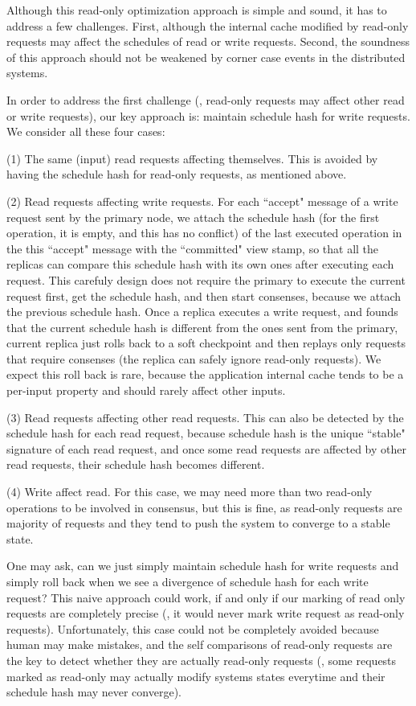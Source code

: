 Although this read-only optimization approach is simple and sound, it has to 
address a few challenges. First, although the internal cache modified by read-only 
requests may affect the schedules of read or write requests. Second, the 
soundness of this approach should not be weakened by corner case events in the 
distributed systems.

In order to address the first challenge (\ie, read-only requests may affect 
other read or write requests), our key approach is: maintain schedule hash for write 
requests. We consider all these four cases:

(1) The same (input) read requests affecting themselves. This is avoided by 
having the schedule hash for read-only requests, as mentioned above.

(2) Read requests affecting write requests. For each ``accept" message of a 
write request sent by the \paxos primary node, we attach the schedule hash (for 
the first operation, it is empty, and this has no conflict) of 
the last executed operation in the this ``accept" message with the ``committed" 
view stamp, so that all the replicas can compare this schedule hash with its 
own ones after executing each request. This carefuly design does not require 
the primary to execute the current request first, get the schedule hash, and 
then start consenses, because we attach the previous schedule hash. Once a 
replica executes a write request, and founds that the current schedule hash is 
different from the ones sent from the primary, current replica just rolls back 
to a soft checkpoint and then replays only requests that require consenses (the 
replica can safely ignore read-only requests). We expect this roll back is 
rare, because the application internal cache tends to be a per-input property 
and should rarely affect other inputs.

(3) Read requests affecting other read requests. This can also be detected by 
the schedule hash for each read request, because schedule hash is the unique ``stable" 
signature of each read request, and once some read requests are affected by 
other read requests, their schedule hash becomes different.

(4) Write affect read. For this case, we may need more than two read-only 
operations to be involved in consensus, but this is fine, as read-only requests 
are majority of requests and they tend to push the system to converge to a 
stable state.

One may ask, can we just simply maintain schedule hash for write requests and 
simply roll back when we see a divergence of schedule hash for each write 
request? This naive approach could work, if and only if our marking of read 
only requests are completely precise (\ie, it would never mark write request as 
read-only requests). Unfortunately, this case could not be completely avoided 
because human may make mistakes, and the self comparisons of read-only requests 
are the key to detect whether they are actually read-only requests (\eg, some 
requests marked as read-only may actually modify systems states everytime and 
their schedule hash may never converge).

